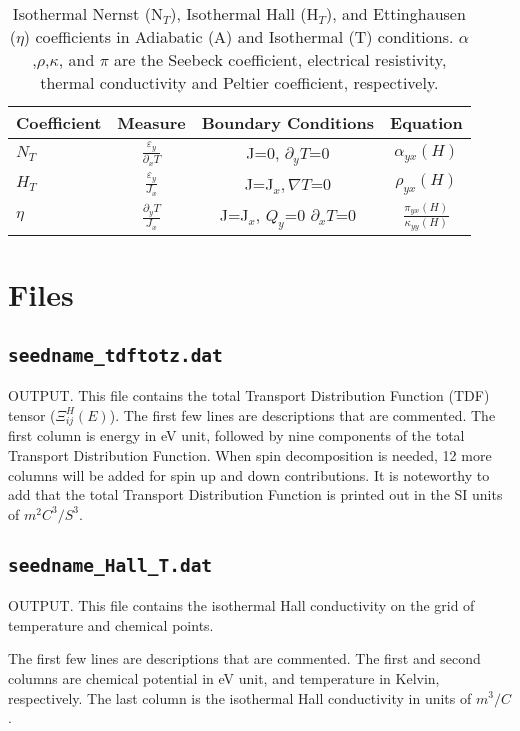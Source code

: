 \begin{table}
 \caption{Isothermal Nernst (N$_{T}$), Isothermal Hall (H$_{T}$), and Ettinghausen ($\eta$) coefficients in Adiabatic (A) and Isothermal (T) conditions. $\alpha$,$\rho$,$\kappa$, and $\pi$ are the Seebeck coefficient, electrical resistivity, thermal conductivity and Peltier coefficient, respectively.}
 \centering
 \noindent
 \begin{tabular}{lccc} %
    \hline
    \hline
    \textbf{Coefficient} &\textbf{Measure} &\textbf{Boundary Conditions} & \textbf{Equation}  \\
    \hline
    \hline
   $N_{T}$  & $\frac{\varepsilon_y}{\partial_x T}$ & J=0, $ \partial_yT\textbf{=}0$ & $\alpha_{yx}(H)$   \\
    $H_{T}$  & $\frac{\varepsilon_y}{J_x }$ &  J=J$_x, \nabla T\textbf{=}0$ & $\rho _{yx}(H)$ \\
    $\eta$    & $\frac{\partial_yT}{J_x}$ &  J=J$_x$, $Q_y\textbf{=}0$ $\partial_xT\textbf{=}0$ & $\frac{\pi_{yx}(H)}{\kappa_{yy}(H)}$\\
    \hline  
    \hline 
 \end{tabular}
 \label{TMco}
\end{table}

\section{Files}

\subsection{{\tt seedname\_tdftotz.dat}}
OUTPUT. This file contains the total Transport Distribution Function (TDF) tensor ($\Xi_{ij}^H(E)$). The first few lines are descriptions that are commented. The first column is energy in eV unit, followed by nine components of the total Transport Distribution Function. When spin decomposition is needed, 12  more columns will be added for spin up and down contributions.  It is noteworthy to add that the total Transport Distribution Function is printed out in the SI units of  $m^2C^3/S^3$.  

\subsection{{\tt seedname\_Hall_T.dat}}
OUTPUT. This file contains the isothermal Hall conductivity on the grid of temperature and chemical points. 

The first few lines are descriptions that are commented. The first and second columns are chemical potential in eV unit, and temperature in Kelvin, respectively. The last column is the isothermal Hall conductivity in units of $m^3/C$. 

